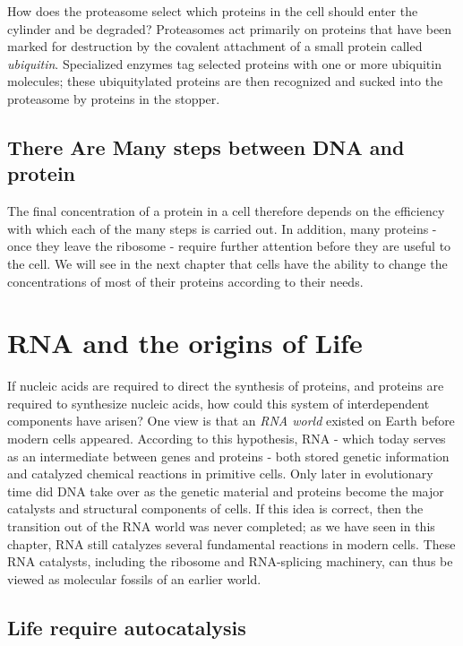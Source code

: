 How does the proteasome select which proteins in the cell should enter
the cylinder and be degraded? Proteasomes act primarily on proteins that
have been marked for destruction by the covalent attachment of a small
protein called \textit{ubiquitin}. Specialized enzymes tag selected proteins with
one or more ubiquitin molecules; these ubiquitylated proteins are then
recognized and sucked into the proteasome by proteins in the stopper.

\subsection{There Are Many steps between DNA and protein}

The final concentration of a protein in
a cell therefore depends on the efficiency with which each of the many
steps is carried out. In addition, many proteins - once they leave the
ribosome - require further attention before they are useful to the cell.
We will see in the next chapter that cells have the ability to change the
concentrations of most of their proteins according to their needs.

\section{RNA and the origins of Life}

If nucleic acids are required
to direct the synthesis of proteins, and proteins are required to synthesize
nucleic acids, how could this system of interdependent components have
arisen? One view is that an \textit{RNA world} existed on Earth before modern
cells appeared. According to this hypothesis, RNA - which
today serves as an intermediate between genes and proteins - both stored
genetic information and catalyzed chemical reactions in primitive cells.
Only later in evolutionary time did DNA take over as the genetic material
and proteins become the major catalysts and structural components of
cells. If this idea is correct, then the transition out of the RNA world was
never completed; as we have seen in this chapter, RNA still catalyzes
several fundamental reactions in modern cells. These RNA catalysts,
including the ribosome and RNA-splicing machinery, can thus be viewed
as molecular fossils of an earlier world.

\subsection{Life require autocatalysis}

